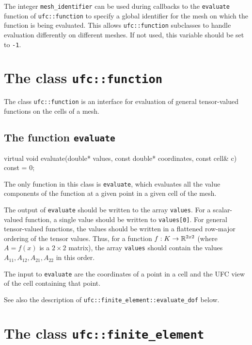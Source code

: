 The integer \texttt{mesh\_identifier} can be used during callbacks to
the \texttt{evaluate} function of \texttt{ufc::function} to specify a
global identifier for the mesh on which the function is being
evaluated. This allows \texttt{ufc::function} subclasses to handle
evaluation differently on different meshes. If not used, this variable
should be set to \texttt{-1}.

\section{The class \texttt{ufc::function}}

The class \texttt{ufc::function} is an interface for evaluation of
general tensor-valued functions on the cells of a mesh.

\subsection{The function \texttt{evaluate}}

\begin{code}
virtual void evaluate(double* values,
                      const double* coordinates,
                      const cell& c) const = 0;
\end{code}

The only function in this class is \texttt{evaluate}, which evaluates
all the value components of the function at a given point in a given
cell of the mesh.

The output of \texttt{evaluate} should be written to the array
\texttt{values}. For a scalar-valued function, a single value should be
written to \texttt{values[0]}. For general tensor-valued functions,
the values should be written in a flattened row-major ordering of the
tensor values. Thus, for a function $f : K \rightarrow \mathbb{R}^{2x2}$ (where $A =
f(x)$ is a $2 \times 2$ matrix), the array \texttt{values} should contain
the values $A_{11}, A_{12}, A_{21}, A_{22}$ in this order.

The input to \texttt{evaluate} are the coordinates of a point in a cell
and the UFC view of the cell containing that point.

See also the description of
\texttt{ufc::finite\_element::evaluate\_dof} below.

\section{The class \texttt{ufc::finite\_element}}

